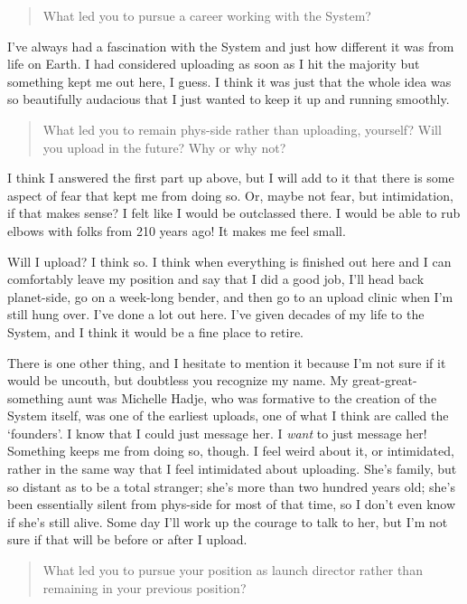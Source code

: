 \begin{quote}
What led you to pursue a career working with the System?
\end{quote}

I've always had a fascination with the System and just how different it was from life on Earth. I had considered uploading as soon as I hit the majority but something kept me out here, I guess. I think it was just that the whole idea was so beautifully audacious that I just wanted to keep it up and running smoothly.

\begin{quote}
What led you to remain phys-side rather than uploading, yourself? Will you upload in the future? Why or why not?
\end{quote}

I think I answered the first part up above, but I will add to it that there is some aspect of fear that kept me from doing so. Or, maybe not fear, but intimidation, if that makes sense? I felt like I would be outclassed there. I would be able to rub elbows with folks from 210 years ago! It makes me feel small.

Will I upload? I think so. I think when everything is finished out here and I can comfortably leave my position and say that I did a good job, I'll head back planet-side, go on a week-long bender, and then go to an upload clinic when I'm still hung over. I've done a lot out here. I've given decades of my life to the System, and I think it would be a fine place to retire.

There is one other thing, and I hesitate to mention it because I'm not sure if it would be uncouth, but doubtless you recognize my name. My great-great-something aunt was Michelle Hadje, who was formative to the creation of the System itself, was one of the earliest uploads, one of what I think are called the `founders'. I know that I could just message her. I \emph{want} to just message her! Something keeps me from doing so, though. I feel weird about it, or intimidated, rather in the same way that I feel intimidated about uploading. She's family, but so distant as to be a total stranger; she's more than two hundred years old; she's been essentially silent from phys-side for most of that time, so I don't even know if she's still alive. Some day I'll work up the courage to talk to her, but I'm not sure if that will be before or after I upload.

\begin{quote}
What led you to pursue your position as launch director rather than remaining in your previous position?
\end{quote}

